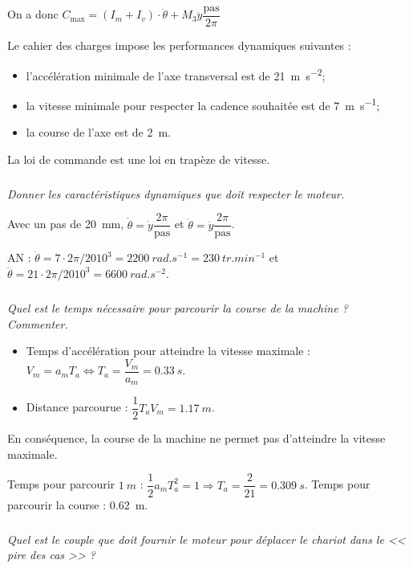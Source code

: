 \begin{multicols}{2}
\begin{corrige}
On a donc $C_{\text{max}}=(I_m+I_v)\cdot \ddot{\theta}+M_3 \ddot{y}\dfrac{\text{pas}}{2\pi}$
\end{corrige}
\else
\fi

Le cahier des charges impose les performances dynamiques suivantes : 
\begin{itemize}
\item l'accélération minimale de l'axe transversal est de \SI{21}{m.s^{-2}};
\item la vitesse minimale pour respecter la cadence souhaitée est de \SI{7}{m.s^{-1}};
\item la course de l'axe est de \SI{2}{m}.
\end{itemize}

La loi de commande est une loi en trapèze de vitesse. 
\subparagraph{}
\textit{Donner les caractéristiques dynamiques que doit respecter le moteur.}
\ifprof
\begin{corrige}
Avec un pas de \SI{20}{mm}, $\dot{\theta}=\dot{y}\dfrac{2\pi}{\text{pas}}$ et $\ddot{\theta}=\ddot{y}\dfrac{2\pi}{\text{pas}}$. 

AN : $\dot{\theta}=7\cdot 2\pi/20 10^3=\SI{2200}{rad.s^{-1}}=\SI{230}{tr.min^{-1}}$ et $\ddot{\theta}=21\cdot 2\pi/20 10^3 = \SI{6600}{rad.s^{-2}}$.
\end{corrige}
\else
\fi

\subparagraph{}
\textit{Quel est le temps nécessaire pour parcourir la course de la machine ? Commenter.}
\ifprof
\begin{corrige}
\begin{itemize}
\item Temps d'accélération pour atteindre la vitesse maximale : $V_m = a_m T_a \Leftrightarrow T_a = \dfrac{V_m}{a_m}=\SI{0,33}{s}$. 
\item Distance parcourue : $\dfrac{1}{2}T_aV_m = \SI{1,17}{m}$. 
\end{itemize}
En conséquence, la course de la machine ne permet pas d'atteindre la vitesse maximale. 

Temps pour parcourir $\SI{1}{m}$ : $\dfrac{1}{2}a_mT_a^2 =1 \Rightarrow T_a = \dfrac{2}{21}=\SI{0,309}{s}$. Temps pour parcourir la course : \SI{0,62}{m}.
\end{corrige}
\else
\fi


\subparagraph{}
\textit{Quel est le couple que doit fournir le moteur pour déplacer le chariot dans le << pire des cas >> ?}
\ifprof
\begin{corrige}
\end{corrige}
\else
\fi



\ifprof
\else
\end{multicols}
\fi

%
